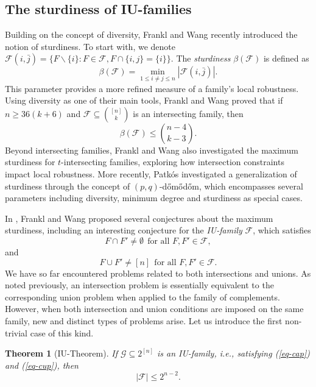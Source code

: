 \documentclass[11pt]{article}
\newtheorem{theorem}{Theorem}[section]
\begin{document}
\subsection{The sturdiness of IU-families}

Building on the concept of diversity, Frankl and Wang \cite{FW-stur} recently introduced the notion of sturdiness. To start with, 
we denote $ \mathcal{F} (i,\bar{j})=\{F\backslash\{i\}:  F\in \mathcal{F}, F\cap\{i,j\}=\{i\}\}$. 
The \textit{sturdiness} $\beta(\mathcal{F})$ is  defined as 
$$\beta(\mathcal{F}) = \min_{1 \leq i \neq j \leq n} |\mathcal{F}(i,\bar{j})|.$$ 
 This parameter provides a more refined measure of a family's local robustness. Using diversity as one of their main tools, Frankl and Wang \cite{FW-stur} proved that if $n \geq 36(k+6)$ and $\mathcal{F} \subseteq \binom{[n]}{k}$ is an intersecting family, then 
 \[ \beta(\mathcal{F}) \leq \binom{n-4}{k-3}. \] 
 Beyond intersecting families, Frankl and Wang also investigated the maximum sturdiness for $t$-intersecting families, exploring how intersection constraints impact local robustness.
More recently,  Patk\'{o}s \cite{Pat2025} investigated a generalization of sturdiness through the concept of $(p,q)$-d\H{o}m\H{o}d\H{o}m, which encompasses several parameters including diversity, minimum degree and sturdiness as special cases.



 In  \cite{FW-stur},
 Frankl and Wang proposed several conjectures about the maximum sturdiness, including an interesting conjecture for the \textit{IU-family} $\mathcal{F}$, which satisfies 
 \begin{equation} \label{eq-cap}
     F\cap F' \neq \emptyset ~~\text{for all $F,F'\in \mathcal{F}$}, 
 \end{equation}
 and 
 \begin{equation}
     \label{eq-cup}
     F\cup F' \neq [n] ~~\text{for all $F,F'\in \mathcal{F}$}.
 \end{equation}
 We have so far encountered problems related to both intersections and unions. As noted previously, an intersection problem is essentially equivalent to the corresponding union problem when applied to the family of complements. However, when both intersection and union conditions are imposed on the same family, new and distinct types of problems arise. Let us introduce the first non-trivial case of this kind. 

 \begin{theorem}[IU-Theorem]
 If $\mathcal{G}\subseteq 2^{[n]}$ is an IU-family, i.e., satisfying (\ref{eq-cap}) and (\ref{eq-cup}), then
\[ |\mathcal{F}| \le 2^{n-2}.  \] 
\end{theorem}
\end{document}
